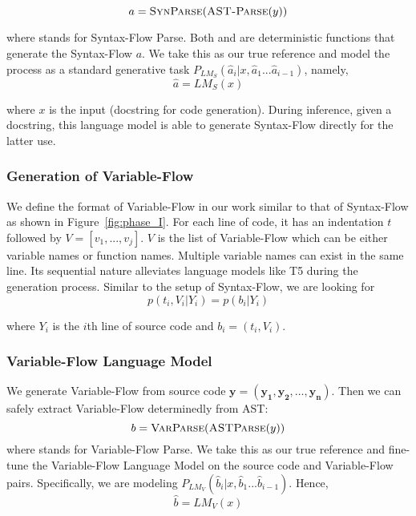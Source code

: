 \documentclass[11pt]{article}
\begin{document}
\begin{equation}
a = \textproc{SynParse}( \textproc{AST-Parse}(y))
\end{equation}

where  stands for Syntax-Flow Parse. Both  and  are deterministic functions that generate the Syntax-Flow $a$. We take this as our true reference and model the process as a standard generative task $P_{LM_S}(\hat{a}_{i} | x,\hat{a}_{1} ... \hat{a}_{i-1})$, namely, 
\begin{equation}
\hat{a} = LM_S(x)
\end{equation}

where $x$ is the input (docstring for code generation). During inference, given a docstring, this language model is able to generate Syntax-Flow directly for the latter use. 

\subsubsection{Generation of Variable-Flow } 
We define the format of Variable-Flow in our work similar to that of Syntax-Flow as shown in Figure~\ref{fig:phase_I}. For each line of code, it has an indentation $t$ followed by $V = [v_1,...,v_j]$. $V$ is the list of Variable-Flow which can be either variable names or function names. Multiple variable names can exist in the same line. Its sequential nature alleviates language models like T5 during the generation process. Similar to the setup of Syntax-Flow, we are looking for 
\begin{equation}
p(t_i,V_i|Y_i) = p(b_i|Y_i) 
\end{equation}

where $Y_i$ is the $i$th line of source code and $b_i = (t_i,V_i)$. 
\subsubsection{Variable-Flow Language Model}
We generate Variable-Flow from source code $\bm{y}=(\bm{y_1},\bm{y_2},\dots,\bm{y_n})$. Then we can safely extract Variable-Flow determinedly from AST:
\begin{equation}
b = \textproc{VarParse}(\textproc{ASTParse}(y))
\end{equation}
where  stands for Variable-Flow Parse. We take this as our true reference and fine-tune the Variable-Flow Language Model on the source code and 
Variable-Flow pairs. Specifically, we are modeling $P_{LM_V}(\hat{b}_{i} | x,\hat{b}_{1} ... \hat{b}_{i-1})
$. Hence,
\begin{equation}
\hat{b} = LM_V(x)
\end{equation}
\end{document}
